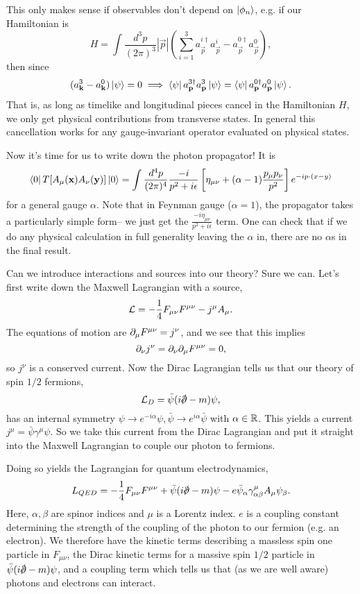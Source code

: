 This only makes sense if observables don't depend on $\left| \phi_n \right>$, e.g. if our Hamiltonian is
$$H=\int \frac{d^3p}{(2\pi)^3} |\vec p| \left(\sum_{i=1}^3 a_{\vec p}^{i\dagger} a_{\vec p}^i - a_{\vec p}^{0\dagger} a_{\vec p}^0\right),$$
then since $$(a_{\boldsymbol{\mathbf{k}}}^3 -a_{\boldsymbol{\mathbf{k}}}^0)\left| \psi \right>=0 \implies \left< \psi \right| a_{\boldsymbol{\mathbf{p}}}^{3\dagger} a_{\boldsymbol{\mathbf{p}}}^3 \left| \psi \right>=\left< \psi \right| a_{\boldsymbol{\mathbf{p}}}^{0\dagger} a_{\boldsymbol{\mathbf{p}}}^0 \left| \psi \right>.$$
That is, as long as timelike and longitudinal pieces cancel in the Hamiltonian $H$, we only get physical contributions from transverse states.
In general this cancellation works for any gauge-invariant operator evaluated on physical states.

Now it's time for us to write down the photon propagator! It is
$$\left< 0 \right|T[A_\mu(\boldsymbol{\mathbf{x}})A_\nu (\boldsymbol{\mathbf{y}})]\left| 0 \right>= \int \frac{d^4p}{(2\pi)^4} \frac{-i}{p^2+i\epsilon} \left[\eta_{\mu\nu}+(\alpha-1)\frac{p_\mu p_\nu}{p^2}\right]e^{-ip\cdot (x-y)}$$
for a general gauge $\alpha$. Note that in Feynman gauge ($\alpha=1$), the propagator takes a particularly simple form-- we just get the $\frac{-i \eta_{\mu\nu}}{p^2+i\epsilon}$ term. One can check that if we do any physical calculation in full generality leaving the $\alpha$ in, there are no $\alpha$s in the final result.

Can we introduce interactions and sources into our theory? Sure we can. Let's first write down the Maxwell Lagrangian with a source,
$$\mathcal L=-\frac{1}{4}F_{\mu\nu}F^{\mu\nu}-j^\mu A_\mu.$$
The equations of motion are $\partial_\mu F^{\mu\nu}=j^\nu$, and we see that this implies
$$\partial_\nu j^\nu =\partial_\nu \partial_\mu F^{\mu\nu}=0,$$
so $j^\nu$ is a conserved current. Now the Dirac Lagrangian tells us that our theory of spin $1/2$ fermions,
$$\cL_D=\bar \psi(i\slashed{\p}-m)\psi,$$
has an internal symmetry $\psi\to e^{-i\alpha}\psi, \bar \psi \to e^{i\alpha}\bar \psi$ with $\alpha\in \mathbb{R}$. This yields a current $j^\mu=\bar \psi \gamma^\mu \psi$. So we take this current from the Dirac Lagrangian and put it straight into the Maxwell Lagrangian to couple our photon to fermions.

Doing so yields the Lagrangian for quantum electrodynamics,
$$L_{QED}=-\frac{1}{4}F_{\mu\nu}F^{\mu\nu}+\bar \psi(i\slashed{\p}-m)\psi - e\bar \psi_\alpha \gamma^\mu_{\alpha\beta} A_\mu \psi_\beta.$$
Here, $\alpha,\beta$ are spinor indices and $\mu$ is a Lorentz index. $e$ is a coupling constant determining the strength of the coupling of the photon to our fermion (e.g. an electron). We therefore have the kinetic terms describing a massless spin one particle in $F_{\mu\nu}$, the Dirac kinetic terms for a massive spin $1/2$ particle in $\bar \psi(i\slashed{\p}-m)\psi$, and a coupling term which tells us that (as we are well aware) photons and electrons can interact.
